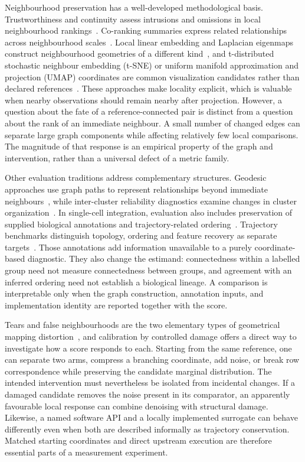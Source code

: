 \documentclass[11pt]{article}
\begin{document}
Neighbourhood preservation has a well-developed methodological basis. Trustworthiness and continuity assess intrusions and omissions in local neighbourhood rankings~\cite{venna2006local,venna2010retrieval}. Co-ranking summaries express related relationships across neighbourhood scales~\cite{lee2009quality}. Local linear embedding and Laplacian eigenmaps construct neighbourhood geometries of a different kind~\cite{roweis2000lle,belkin2003laplacian}, and t-distributed stochastic neighbour embedding (t-SNE) or uniform manifold approximation and projection (UMAP) coordinates are common visualization candidates rather than declared references~\cite{vandermaaten2008tsne,becht2019umap}. These approaches make locality explicit, which is valuable when nearby observations should remain nearby after projection. However, a question about the fate of a reference-connected pair is distinct from a question about the rank of an immediate neighbour. A small number of changed edges can separate large graph components while affecting relatively few local comparisons. The magnitude of that response is an empirical property of the graph and intervention, rather than a universal defect of a metric family.

Other evaluation traditions address complementary structures. Geodesic approaches use graph paths to represent relationships beyond immediate neighbours~\cite{tenenbaum2000global}, while inter-cluster reliability diagnostics examine changes in cluster organization~\cite{jeon2022steadiness}. In single-cell integration, evaluation also includes preservation of supplied biological annotations and trajectory-related ordering~\cite{luecken2022benchmarking}. Trajectory benchmarks distinguish topology, ordering and feature recovery as separate targets~\cite{saelens2019comparison}. Those annotations add information unavailable to a purely coordinate-based diagnostic. They also change the estimand: connectedness within a labelled group need not measure connectedness between groups, and agreement with an inferred ordering need not establish a biological lineage. A comparison is interpretable only when the graph construction, annotation inputs, and implementation identity are reported together with the score.

Tears and false neighbourhoods are the two elementary types of geometrical mapping distortion~\cite{lespinats2011checkviz}, and calibration by controlled damage offers a direct way to investigate how a score responds to each. Starting from the same reference, one can separate two arms, compress a branching coordinate, add noise, or break row correspondence while preserving the candidate marginal distribution. The intended intervention must nevertheless be isolated from incidental changes. If a damaged candidate removes the noise present in its comparator, an apparently favourable local response can combine denoising with structural damage. Likewise, a named software API and a locally implemented surrogate can behave differently even when both are described informally as trajectory conservation. Matched starting coordinates and direct upstream execution are therefore essential parts of a measurement experiment.
\end{document}

